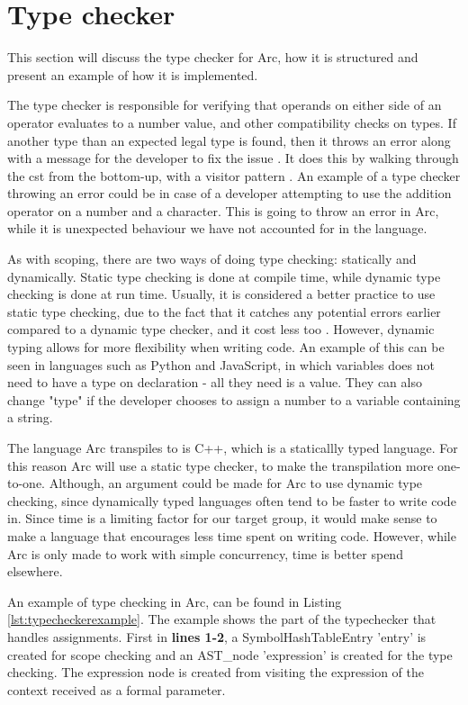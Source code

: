 \section{Type checker}\label{sec:typechecker}

This section will discuss the type checker for Arc, how it is structured and present an example of how it is implemented.

The type checker is responsible for verifying that operands on either side of an operator evaluates to a number value, and other compatibility checks on types. If another type than an expected legal type is found, then it throws an error along with a message for the developer to fix the issue \cite{Sebesta2016}. It does this by walking through the \gls{cst} from the bottom-up, with a visitor pattern \cite{Parr2014}. An example of a type checker throwing an error could be in case of a developer attempting to use the addition operator on a number and a character. This is going to throw an error in Arc, while it is unexpected behaviour we have not accounted for in the language.

As with scoping, there are two ways of doing type checking: statically and dynamically. Static type checking is done at compile time, while dynamic type checking is done at run time. Usually, it is considered a better practice to use static type checking, due to the fact that it catches any potential errors earlier compared to a dynamic type checker, and it cost less too \cite{Sebesta2016}. However, dynamic typing allows for more flexibility when writing code. An example of this can be seen in languages such as Python and JavaScript, in which variables does not need to have a type on declaration - all they need is a value. They can also change "type" if the developer chooses to assign a number to a variable containing a string.

The language Arc transpiles to is C++, which is a staticallly typed language. For this reason Arc will use a static type checker, to make the transpilation more one-to-one. Although, an argument could be made for Arc to use dynamic type checking, since dynamically typed languages often tend to be faster to write code in. Since time is a limiting factor for our target group, it would make sense to make a language that encourages less time spent on writing code. However, while Arc is only made to work with simple concurrency, time is better spend elsewhere.

An example of type checking in Arc, can be found in Listing \ref{lst:typecheckerexample}. The example shows the part of the typechecker that handles assignments. First in \textbf{lines 1-2}, a SymbolHashTableEntry 'entry' is created for scope checking and an AST\_node 'expression' is created for the type checking. The expression node is created from visiting the expression of the context received as a formal parameter.

